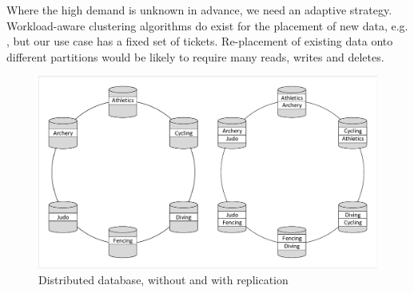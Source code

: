 Where the high demand is unknown in advance, we need an adaptive strategy.  Workload-aware clustering algorithms do exist for the placement of new data, e.g. \cite{RN63}, but our use case has a fixed set of tickets.  Re-placement of existing data onto different partitions would be likely to require many reads, writes and deletes.

\begin{figure}
\caption{Distributed database, without and with replication}
\centering
\includegraphics[trim = 5 5 5 5, clip, width=\textwidth]{img/dbdist}
\end{figure}
